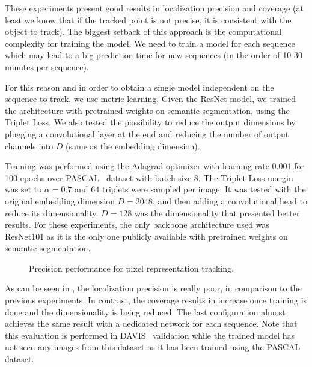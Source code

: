 These experiments present good results in localization precision and coverage (at least we know that if the tracked point is not precise, it is consistent with the object to track).
The biggest setback of this approach is the computational complexity for training the model.
We need to train a model for each sequence which may lead to a big prediction time for new sequences (in the order of 10-30 minutes per sequence).

For this reason and in order to obtain a single model independent on the sequence to track, we use metric learning.
Given the ResNet model, we trained the architecture with pretrained weights on semantic segmentation, using the Triplet Loss.
We also tested the possibility to reduce the output dimensions by plugging a convolutional layer at the end and reducing the number of output channels into $D$ (same as the embedding dimension).

Training was performed using the Adagrad optimizer with learning rate $0.001$ for 100 epochs over PASCAL~\pascal{} dataset with batch size $8$.
The Triplet Loss margin was set to $\alpha = 0.7$ and $64$ triplets were sampled per image.
It was tested with the original embedding dimension $D=2048$, and then adding a convolutional head to reduce its dimensionality.
$D=128$ was the dimensionality that presented better results.
For these experiments, the only backbone architecture used was ResNet101 as it is the only one publicly available with pretrained weights on semantic segmentation.


\begin{figure}[h]
  \centering
  
  \caption{Precision performance for pixel representation tracking.}
  \label{fig:experiments:tracking:metriclearning}
\end{figure}

As can be seen in , the localization precision is really poor, in comparison to the previous experiments.
In contrast, the coverage results in  increase once training is done and the dimensionality is being reduced. The last configuration almost achieves the same result with a dedicated network for each sequence.
Note that this evaluation is performed in DAVIS~\davislast{} validation while the trained model has not seen any images from this dataset as it has been trained using the PASCAL dataset.


